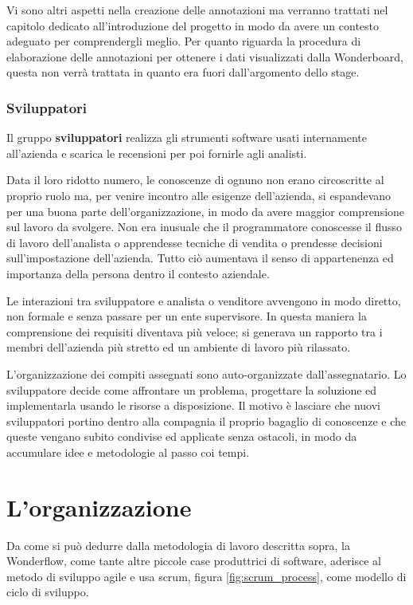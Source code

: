 Vi sono altri aspetti nella creazione delle annotazioni ma verranno trattati
nel capitolo dedicato all'introduzione del progetto in modo da avere un
contesto adeguato per comprendergli meglio. Per quanto riguarda la procedura di
elaborazione delle annotazioni per ottenere i dati visualizzati dalla
Wonderboard, questa non verrà trattata in quanto era fuori dall'argomento dello
stage.

\subsubsection{Sviluppatori}
Il gruppo \textbf{sviluppatori} realizza gli strumenti software usati
internamente all'azienda e scarica le recensioni per poi fornirle agli analisti.
\newline

Data il loro ridotto numero, le conoscenze di ognuno non erano circoscritte al
proprio ruolo ma, per venire incontro alle esigenze dell'azienda, si
espandevano per una buona parte dell'organizzazione, in modo da avere maggior
comprensione sul lavoro da svolgere. Non era inusuale che il programmatore
conoscesse il flusso di lavoro dell'analista o apprendesse tecniche di vendita
o prendesse decisioni sull'impostazione dell'azienda. Tutto ciò aumentava il
senso di appartenenza ed importanza della persona dentro il contesto aziendale.
\newline

Le interazioni tra sviluppatore e analista o venditore avvengono in modo
diretto, non formale e senza passare per un ente supervisore. In questa maniera
la comprensione dei requisiti diventava più veloce; si generava un rapporto tra
i membri dell'azienda più stretto ed un ambiente di lavoro più rilassato.
\newline

L'organizzazione dei compiti assegnati sono auto-organizzate dall'assegnatario.
Lo sviluppatore decide come affrontare un problema, progettare la soluzione ed
implementarla usando le risorse a disposizione. Il motivo è lasciare che nuovi
sviluppatori portino dentro alla compagnia il proprio bagaglio di conoscenze e
che queste vengano subito condivise ed applicate senza ostacoli, in modo da
accumulare idee e metodologie al passo coi tempi.

\section{L'organizzazione}
Da come si può dedurre dalla metodologia di lavoro descritta sopra, la
Wonderflow, come tante altre piccole case produttrici di software, aderisce
al metodo di sviluppo \gls{agile} e usa \gls{scrum}, figura
\ref{fig:scrum_process}, come modello di ciclo di sviluppo.

